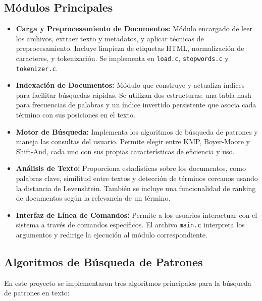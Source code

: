 \documentclass[9pt,letterpaper,onecolumn]{rho-class/rho}
\begin{document}
\subsection{Módulos Principales}
\begin{itemize}
    \item \textbf{Carga y Preprocesamiento de Documentos:}  
    Módulo encargado de leer los archivos, extraer texto y metadatos, y aplicar técnicas de preprocesamiento. Incluye limpieza de etiquetas HTML, normalización de caracteres, y tokenización. Se implementa en \texttt{load.c}, \texttt{stopwords.c} y \texttt{tokenizer.c}.

    \item \textbf{Indexación de Documentos:}  
    Módulo que construye y actualiza índices para facilitar búsquedas rápidas. Se utilizan dos estructuras: una tabla hash para frecuencias de palabras y un índice invertido persistente que asocia cada término con sus posiciones en el texto.

    \item \textbf{Motor de Búsqueda:}  
    Implementa los algoritmos de búsqueda de patrones y maneja las consultas del usuario. Permite elegir entre KMP, Boyer-Moore y Shift-And, cada uno con sus propias características de eficiencia y uso.

    \item \textbf{Análisis de Texto:}  
    Proporciona estadísticas sobre los documentos, como palabras clave, similitud entre textos y detección de términos cercanos usando la distancia de Levenshtein. También se incluye una funcionalidad de ranking de documentos según la relevancia de un término.

    \item \textbf{Interfaz de Línea de Comandos:}  
    Permite a los usuarios interactuar con el sistema a través de comandos específicos. El archivo \texttt{main.c} interpreta los argumentos y redirige la ejecución al módulo correspondiente.
\end{itemize}

\subsection{Algoritmos de Búsqueda de Patrones}

En este proyecto se implementaron tres algoritmos principales para la búsqueda de patrones en texto:
\end{document}
